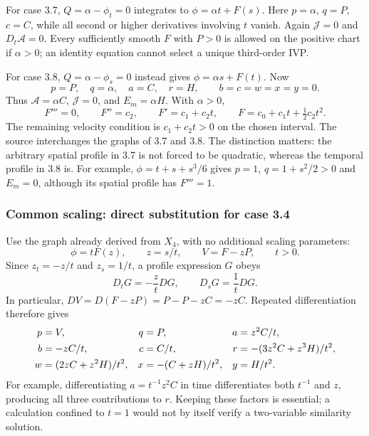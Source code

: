 \documentclass[11pt]{article}
\theoremstyle{definition}
\begin{document}
For case 3.7, $Q=\alpha-\phi_t=0$ integrates to
$\phi=\alpha t+F(s)$. Here $p=\alpha$, $q=P$, $c=C$, while
all second or higher derivatives involving $t$ vanish. Again
$\mathcal J=0$ and $D_t\mathcal A=0$. Every sufficiently smooth $F$
with $P>0$ is allowed on the positive chart if $\alpha>0$; an
identity equation cannot select a unique third-order IVP.

For case 3.8, $Q=\alpha-\phi_s=0$ instead gives
$\phi=\alpha s+F(t)$. Now
\[
 p=P,\quad q=\alpha,\quad a=C,\quad r=H,
 \qquad b=c=w=x=y=0.
\]
Thus $\mathcal A=\alpha C$, $\mathcal J=0$, and
$E_m=\alpha H$. With $\alpha>0$,
\begin{equation}
 F'''=0,\qquad F''=c_2,\qquad F'=c_1+c_2t,\qquad
 F=c_0+c_1t+\tfrac12c_2t^2.
 \label{eq:sve-quadratic-reduction}
\end{equation}
The remaining velocity condition is $c_1+c_2t>0$ on the chosen interval.
The source interchanges the graphs of 3.7 and 3.8. The distinction matters:
the arbitrary spatial profile in 3.7 is not forced to be quadratic, whereas
the temporal profile in 3.8 is. For example,
$\phi=t+s+s^3/6$ gives $p=1$, $q=1+s^2/2>0$ and $E_m=0$, although
its spatial profile has $F'''=1$.

\subsubsection{Common scaling: direct substitution for case 3.4}
Use the graph already derived from $X_4$, with no additional scaling
parameters:
\begin{equation}
 \phi=tF(z),\qquad z=s/t,\qquad V=F-zP,\qquad t>0.
 \label{eq:sve-repro-scale}
\end{equation}
Since $z_t=-z/t$ and $z_s=1/t$, a profile expression $G$ obeys
\begin{equation}
 D_tG=-\frac zt DG,\qquad D_sG=\frac1t DG.
 \label{eq:sve-scaling-chain}
\end{equation}
In particular, $DV=D(F-zP)=P-P-zC=-zC$. Repeated differentiation
therefore gives
\begin{align}
 p&=V,&q&=P,&a&=z^2C/t,\notag\\
 b&=-zC/t,&c&=C/t,&r&=-(3z^2C+z^3H)/t^2,\notag\\
 w&=(2zC+z^2H)/t^2,&x&=-(C+zH)/t^2,&y&=H/t^2.
 \label{eq:sve-scaling-jets}
\end{align}
For example, differentiating $a=t^{-1}z^2C$ in time differentiates
both $t^{-1}$ and $z$, producing all three contributions to $r$.
Keeping these factors is essential; a calculation confined to $t=1$
would not by itself verify a two-variable similarity solution.
\end{document}

